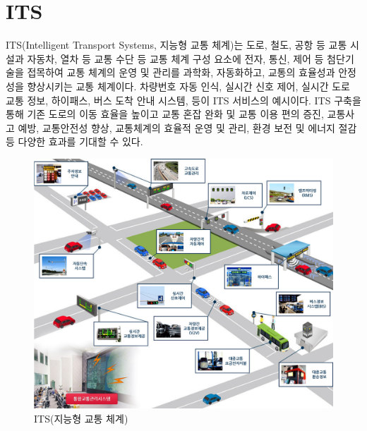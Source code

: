 \section{ITS}
    ITS(Intelligent Transport Systems, 지능형 교통 체계)는 도로, 철도, 공항 등 교통 시설과 자동차, 열차 등 교통 수단 등 교통 체계 구성 요소에 전자, 통신, 제어 등 첨단기술을 접목하여 교통 체계의 운영 및 관리를 과학화, 자동화하고, 교통의 효율성과 안정성을 향상시키는 교통 체계이다. 차량번호 자동 인식, 실시간 신호 제어, 실시간 도로 교통 정보, 하이패스, 버스 도착 안내 시스템,  등이 ITS 서비스의 예시이다. ITS 구축을 통해 기존 도로의 이동 효율을 높이고 교통 혼잡 완화 및 교통 이용 편의 증진, 교통사고 예방, 교통안전성 향상, 교통체계의 효율적 운영 및 관리, 환경 보전 및 에너지 절감 등 다양한 효과를 기대할 수 있다. \\
    \vspace{-4mm}
    \begin{figure}[!h]\centering
		\includegraphics[width=.65\textwidth]{image/week13/1-1.png}
		\caption{\small ITS(지능형 교통 체계)}
		\vspace{-10pt}
    \end{figure}